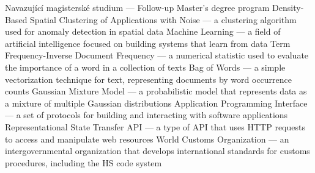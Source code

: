 



 {Navazující magisterské studium — Follow-up Master's degree program}
 {Density-Based Spatial Clustering of Applications with Noise — a clustering algorithm used for anomaly detection in spatial data}
 {Machine Learning — a field of artificial intelligence focused on building systems that learn from data}
 {Term Frequency-Inverse Document Frequency — a numerical statistic used to evaluate the importance of a word in a collection of texts}
 {Bag of Words — a simple vectorization technique for text, representing documents by word occurrence counts}
 {Gaussian Mixture Model — a probabilistic model that represents data as a mixture of multiple Gaussian distributions}
 {Application Programming Interface — a set of protocols for building and interacting with software applications}
 {Representational State Transfer API — a type of API that uses HTTP requests to access and manipulate web resources}
 {World Customs Organization — an intergovernmental organization that develops international standards for customs procedures, including the HS code system}



